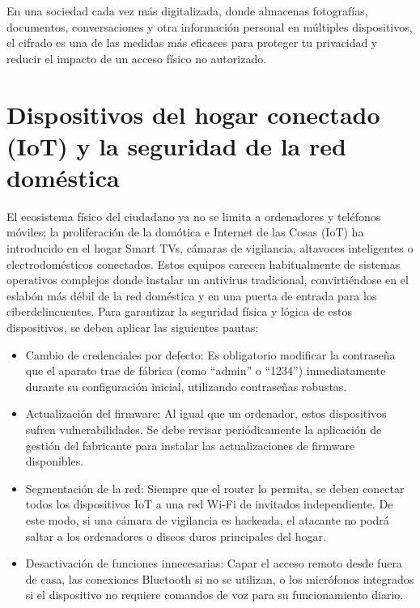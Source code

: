 \documentclass[
  spanish,
  a4paper,
  openany]{book}
\begin{document}
En una sociedad cada vez más digitalizada, donde almacenas fotografías, documentos, conversaciones y otra información personal en múltiples dispositivos, el cifrado es una de las medidas más eficaces para proteger tu privacidad y reducir el impacto de un acceso físico no autorizado.

\section{Dispositivos del hogar conectado (IoT) y la seguridad de la red doméstica}\label{dispositivos-del-hogar-conectado-iot-y-la-seguridad-de-la-red-domuxe9stica}

El ecosistema físico del ciudadano ya no se limita a ordenadores y teléfonos móviles; la proliferación de la domótica e Internet de las Cosas (IoT) ha introducido en el hogar Smart TVs, cámaras de vigilancia, altavoces inteligentes o electrodomésticos conectados. Estos equipos carecen habitualmente de sistemas operativos complejos donde instalar un antivirus tradicional, convirtiéndose en el eslabón más débil de la red doméstica y en una puerta de entrada para los ciberdelincuentes. Para garantizar la seguridad física y lógica de estos dispositivos, se deben aplicar las siguientes pautas:

\begin{itemize}
\item
  Cambio de credenciales por defecto: Es obligatorio modificar la contraseña que el aparato trae de fábrica (como ``admin'' o ``1234'') inmediatamente durante su configuración inicial, utilizando contraseñas robustas.
\item
  Actualización del firmware: Al igual que un ordenador, estos dispositivos sufren vulnerabilidades. Se debe revisar periódicamente la aplicación de gestión del fabricante para instalar las actualizaciones de firmware disponibles.
\item
  Segmentación de la red: Siempre que el router lo permita, se deben conectar todos los dispositivos IoT a una red Wi-Fi de invitados independiente. De este modo, si una cámara de vigilancia es hackeada, el atacante no podrá saltar a los ordenadores o discos duros principales del hogar.
\item
  Desactivación de funciones innecesarias: Capar el acceso remoto desde fuera de casa, las conexiones Bluetooth si no se utilizan, o los micrófonos integrados si el dispositivo no requiere comandos de voz para su funcionamiento diario.
\end{itemize}
\end{document}
